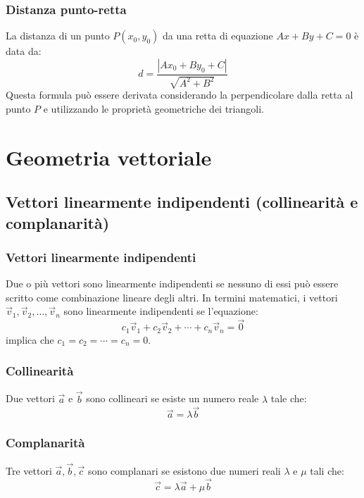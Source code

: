 \documentclass{article}
\begin{document}
\subsubsection{Distanza punto-retta}
La distanza di un punto \(P(x_0, y_0)\) da una retta di equazione \(Ax + By + C = 0\) è data
da:
\[
    d = \frac{|Ax_0 + By_0 + C|}{\sqrt{A^2 + B^2}}
\]
Questa formula può essere derivata considerando la perpendicolare dalla retta al punto \(P\)
e utilizzando le proprietà geometriche dei triangoli.


\newpage
\section{Geometria vettoriale}
\subsection{Vettori linearmente indipendenti (collinearità e complanarità)}

\subsubsection{Vettori linearmente indipendenti}
Due o più vettori sono linearmente indipendenti se nessuno di essi può essere scritto come
combinazione lineare degli altri. In termini matematici, i vettori
\(\vec{v}_1, \vec{v}_2, \ldots, \vec{v}_n\) sono linearmente indipendenti se l'equazione:
\[
    c_1 \vec{v}_1 + c_2 \vec{v}_2 + \cdots + c_n \vec{v}_n = \vec{0}
\]
implica che \(c_1 = c_2 = \cdots = c_n = 0\).

\subsubsection{Collinearità}
Due vettori \(\vec{a}\) e \(\vec{b}\) sono collineari se esiste un numero reale \(\lambda\)
tale che:
\[
    \vec{a} = \lambda \vec{b}
\]

\subsubsection{Complanarità}
Tre vettori \(\vec{a}, \vec{b}, \vec{c}\) sono complanari se esistono due numeri reali
\(\lambda\) e \(\mu\) tali che:
\[
    \vec{c} = \lambda \vec{a} + \mu \vec{b}
\]
\end{document}
